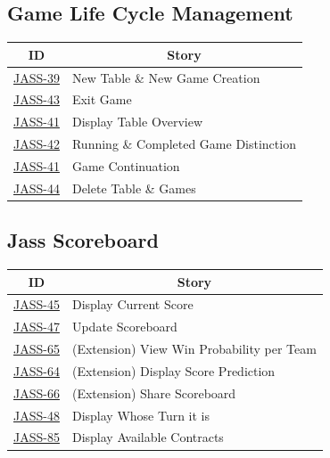 \subsection {Game Life Cycle Management}

\begin{tabular} { | m{1.75 cm} | m{5.25cm} | }
    \hline
    \multicolumn{1}{|c|}{\textbf{ID}} & \multicolumn{1}{|c|}{ \textbf{Story} }  \\
    \hline
    \href{https://jasstracker-jira.atlassian.net/browse/JASS-39}{JASS-39}  & New Table \& New Game Creation \\
    \hline
    \href{https://jasstracker-jira.atlassian.net/browse/JASS-43}{JASS-43} & Exit Game \\
    \hline
    \href{https://jasstracker-jira.atlassian.net/browse/JASS-41}{JASS-41} & Display Table Overview \\ 
    \hline
    \href{https://jasstracker-jira.atlassian.net/browse/JASS-42}{JASS-42} & Running \& Completed Game Distinction \\
    \hline
    \href{https://jasstracker-jira.atlassian.net/browse/JASS-41}{JASS-41} & Game Continuation \\ 
    \hline
    \href{https://jasstracker-jira.atlassian.net/browse/JASS-44}{JASS-44} & Delete Table \& Games \\
    \hline
\end{tabular}

\subsection{Jass Scoreboard}
\begin{tabular} { | m{1.75 cm} | m{5.25cm} | }
    \hline
    \multicolumn{1}{|c|}{\textbf{ID}} & \multicolumn{1}{|c|}{ \textbf{Story} }  \\
    \hline
    \href{https://jasstracker-jira.atlassian.net/browse/JASS-45}{JASS-45} & Display Current Score \\
    \hline
    \href{https://jasstracker-jira.atlassian.net/browse/JASS-47}{JASS-47} & Update Scoreboard \\
    \hline
    \href{https://jasstracker-jira.atlassian.net/browse/JASS-65}{JASS-65} & (Extension) View Win Probability per Team \\
    \hline
    \href{https://jasstracker-jira.atlassian.net/browse/JASS-64}{JASS-64} & (Extension) Display Score Prediction \\
    \hline
    \href{https://jasstracker-jira.atlassian.net/browse/JASS-66}{JASS-66} & (Extension) Share Scoreboard \\
    \hline
    \href{https://jasstracker-jira.atlassian.net/browse/JASS-48}{JASS-48} & Display Whose Turn it is \\
    \hline
    \href{https://jasstracker-jira.atlassian.net/browse/JASS-85}{JASS-85} & Display Available Contracts \\
    \hline
\end{tabular}

